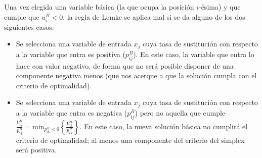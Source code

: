 Una vez elegida una variable básica (la que ocupa la posición $i$-ésima) y que cumple que $u^B_i<0$, la regla de Lemke se aplica mal si se da alguno de los dos siguientes casos:
\begin{itemize}
    \item Se selecciona una variable de entrada $x_j$ cuya tasa de sustitución con respecto a la variable que entra es positiva ($p^B_{ij}$). En este caso, la variable que entra lo hace con valor negativo, de forma que no será posible disponer de una componente negativa menos (que nos acerque a que la solución cumpla con el criterio de optimalidad).
    \item Se selecciona una variable de entrada $x_j$ cuya tasa de sustitución con respecto a la variable que entra es negativa ($p^B_{ij}$) pero no aquella que cumple $\frac{V^B_{ij}}{p^B_{ij}} = \mbox{min}_{p^B_{ik} < 0}\left\{\frac{V^B_{ik}}{p^P_{ik}}\right\}$. En este caso, la nueva solución básica no cumplirá el criterio de optimalidad; al menos una componente del criterio del simplex será positiva.
\end{itemize}